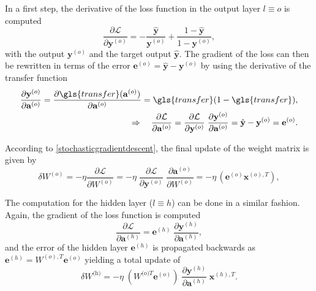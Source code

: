 In a first step, the derivative of the loss function in the output layer $l\equiv o$ is computed
\begin{equation}
\frac{\partial\mathcal{L}}{\partial \mathbf{y}^{(o)}} = 
- \frac{\hat{\mathbf{y}}}{\mathbf{y}^{(o)}} + 
\frac{1 - \hat{\mathbf{y}}}{1 - \mathbf{y}^{(o)}},
\end{equation}
with the output $\mathbf{y}^{(o)}$ and the target output $\hat{\mathbf{y}}$. The gradient of the loss can then be rewritten in terms of the error $\mathbf{e}^{(o)} = \hat{\mathbf{y}} - \mathbf{y}^{(o)}$ by using the derivative of the transfer function
\begin{align}
\frac{\partial \mathbf{y}^{(o)}}{\partial \mathbf{a}^{(o)}} = \frac{\partial \gls{transfer}(\mathbf{a}^{(o)})}{\partial \mathbf{a}^{(o)}} = \gls{transfer} (1 - \gls{transfer}),\\
\Rightarrow \quad \frac{\partial\mathcal{L}}{\partial \mathbf{a}^{(o)}} =
\frac{\partial\mathcal{L}}{\partial \mathbf{y}^{(o)}} 
\; \frac{\partial \mathbf{y}^{(o)}}{\partial \mathbf{a}^{(o)}} =
\hat{\mathbf{y}} - \mathbf{y}^{(o)} = \mathbf{e}^{(o)}.
\end{align}

According to \cref{stochasticgradientdescent}, the final update of the weight matrix is given by
\begin{equation}
\delta W^{(o)} = - \eta \frac{\partial \mathcal{L}}{\partial W^{(o)}} 
= - \eta \;
\frac{\partial\mathcal{L}}{\partial \mathbf{y}^{(o)}} \;
\frac{\partial \mathbf{a}^{(o)}}{\partial W^{(o)}}
= - \eta \, \left(\mathbf{e}^{(o)} \mathbf{x}^{(o),T}\right),
\label{backpropupdate}
\end{equation}

The computation for the hidden layer ($l\equiv h$) can be done in a similar fashion. Again, the gradient of the loss function is computed
\begin{equation}
\frac{\partial\mathcal{L}}{\partial \mathbf{a}^{(h)}} = \mathbf{e}^{(h)} \;
\frac{\partial \mathbf{y}^{(h)} }{\partial \mathbf{a}^{(h)}},
\end{equation}
and the error of the hidden layer $\mathbf{e}^{(h)}$ is propagated backwards as $\mathbf{e}^{(h)}=W^{(o),T}\mathbf{e}^{(o)}$ yielding a total update of
\begin{equation}
\delta W^{\text{(h)}} = - \eta \;
\left(W^{\text{(o)}T} \mathbf{e}^{(o)}\right) \;
\frac{\partial \mathbf{y}^{(h)} }{\partial \mathbf{a}^{(h)}} \; \mathbf{x}^{(h), T}.
\end{equation}

